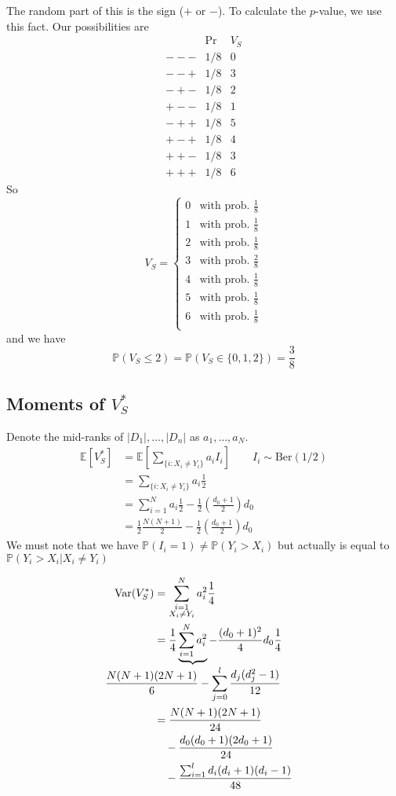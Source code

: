 \documentclass[a4paper,12pt]{amsart}
\newcommand{\sumiN}{\sum_{i=1}^N}
\newcommand{\Var}{\mbox{Var}}
\newcommand{\E}[1]{\mathbb{E}\left[#1\right]}
\newcommand{\p}[1]{\mathbb{P}\left(#1\right)}
\begin{document}
The random part of this is the sign ($+$ or $-$). To calculate the $p$-value, we use this fact. Our possibilities are
\[\begin{array}{c|c|c}
& \text{Pr} & V_S\\
--- & 1/8 & 0\\
--+ & 1/8 & 3\\
-+- & 1/8 & 2\\
+-- & 1/8 & 1\\
-++ & 1/8 & 5\\
+-+ & 1/8 & 4\\
++- & 1/8 & 3\\
+++ & 1/8 & 6
\end{array} \]
So
\[V_S  = \begin{cases}
0 & \text{with prob. } \frac{1}{8}\\
1 & \text{with prob. } \frac{1}{8}\\
2 & \text{with prob. } \frac{1}{8}\\
3 & \text{with prob. } \frac{2}{8}\\
4 & \text{with prob. } \frac{1}{8}\\
5 & \text{with prob. } \frac{1}{8}\\
6 & \text{with prob. } \frac{1}{8}\\
\end{cases} \]
and we have
\[\p{V_S \leq 2} = \p{V_S \in \{0,1,2\}} = \frac{3}{8}\]

\subsection{Moments of $V_S^*$}
Denote the mid-ranks of $|D_1|,\ldots,|D_n|$ as $a_1, \ldots, a_N$.
\begin{align*}
\E{V_S^*} &= \E{\sum_{\{i: X_i \neq Y_i\}} a_i I_i} \qquad I_i \sim \text{Ber}(1/2)\\
&= \sum_{\{i: X_i \neq Y_i\}} a_i \frac{1}{2}\\
&= \sumiN a_i \frac{1}{2} - \frac{1}{2}\left(\frac{d_0 + 1}{2}\right)d_0\\
&= \frac{1}{2}\frac{N(N+1)}{2} - \frac{1}{2}\left(\frac{d_0 + 1}{2}\right)d_0
\end{align*}
We must note that we have $\p{I_i=1} \neq \p{Y_i > X_i}$ but actually is equal to $\p{Y_i > X_i | X_i \neq Y_i}$

\begin{align*}
\Var(V_S^*) &= \sum_{\substack{i=1\\X_i \neq Y_i}}^N a_i^2 \frac{1}{4}\\
&= \frac{1}{4}\underbrace{\sumiN a_i^2}_{\mathclap{\displaystyle \frac{N(N+1)(2N+1)}{6} - \sum_{j=0}^l \frac{d_j(d_j^2-1)}{12}}} - \frac{(d_0+1)^2}{4}d_0\frac{1}{4}\\
&= \frac{N(N+1)(2N+1)}{24}\\
&\quad - \frac{d_0(d_0+1)(2d_0+1)}{24}\\
&\quad - \frac{\sum_{i=1}^l d_i(d_i+1)(d_i-1)}{48}
\end{align*}
\end{document}
